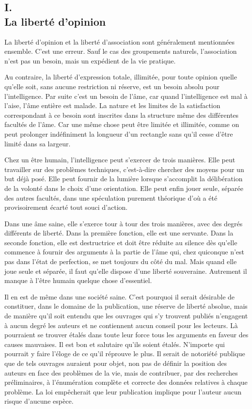 \documentclass[french,twoside]{book} %
\begin{document}
\subsection[I. La liberté d’opinion]{I. \\
La liberté d’opinion}
\noindent \par
La liberté d'opinion et la liberté d'association sont généralement mentionnées ensemble. C'est une erreur. Sauf le cas des groupements naturels, l'association n'est pas un besoin, mais un expédient de la vie pratique.\par
Au contraire, la liberté d'expression totale, illimitée, pour toute opinion quelle qu'elle soit, sans aucune restriction ni réserve, est un besoin absolu pour l'intelligence. Par suite c'est un besoin de l'âme, car quand l'intelligence est mal à l'aise, l'âme entière est malade. La nature et les limites de la satisfaction correspondant à ce besoin sont inscrites dans la structure même des différentes facultés de l'âme. Car une même chose peut être limitée et illimitée, comme on peut prolonger indéfiniment la longueur d'un rectangle sans qu'il cesse d'être limité dans sa largeur.\par
Chez un être humain, l'intelligence peut s'exercer de trois manières. Elle peut travailler sur des problèmes techniques, c'est-à-dire chercher des moyens pour un but déjà posé. Elle peut fournir de la lumière lorsque s'accomplit la délibération de la volonté dans le choix d'une orientation. Elle peut enfin jouer seule, séparée des autres facultés, dans une spéculation purement théorique d'où a été provisoirement écarté tout souci d'action.\par
Dans une âme saine, elle s'exerce tour à tour des trois manières, avec des degrés différents de liberté. Dans la première fonction, elle est une servante. Dans la seconde fonction, elle est destructrice et doit être réduite au silence dès qu'elle commence à fournir des arguments à la partie de l'âme qui, chez quiconque n'est pas dans l'état de perfection, se met toujours du côté du mal. Mais quand elle joue seule et séparée, il faut qu'elle dispose d'une liberté souveraine. Autrement il manque à l'être humain quelque chose d'essentiel.\par
Il en est de même dans une société saine. C'est pourquoi il serait désirable de constituer, dans le domaine de la publication, une réserve de liberté absolue, mais de manière qu'il soit entendu que les ouvrages qui s'y trouvent publiés n'engagent à aucun degré les auteurs et ne contiennent aucun conseil pour les lecteurs. Là pourraient se trouver étalés dans toute leur force tous les arguments en faveur des causes mauvaises. Il est bon et salutaire qu'ils soient étalés. N'importe qui pourrait y faire l'éloge de ce qu'il réprouve le plus. Il serait de notoriété publique que de tels ouvrages auraient pour objet, non pas de définir la position des auteurs en face des problèmes de la vie, mais de contribuer, par des recherches préliminaires, à l'énumération complète et correcte des données relatives à chaque problème. La loi empêcherait que leur publication implique pour l'auteur aucun risque d'aucune espèce.\par
\end{document}
